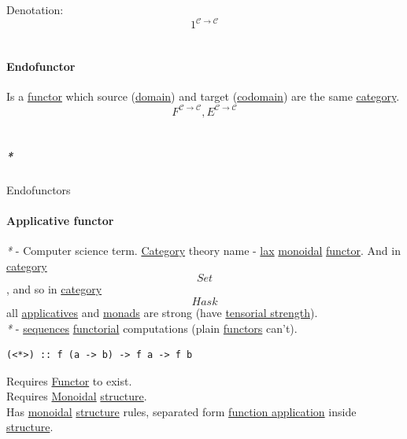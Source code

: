 \documentclass[11pt]{article}
\begin{document}
Denotation:\\
$$ 1^{\mathcal{C \to C}} $$\\

\paragraph{\label{org4dce7a1}Endofunctor}
\label{sec:orgb286a70}
Is a \hyperref[org6073683]{functor} which source (\hyperref[orgf784585]{domain}) and target (\hyperref[orgee70232]{codomain}) are the same \hyperref[org3e3a79b]{category}.\\

$$ F^{\mathcal{C \to C}}, E^{\mathcal{C \to C}} $$\\

\subparagraph{\emph{*}}
\label{sec:org5d44dab}

\label{org1a8cedf}Endofunctors\\

\paragraph{\label{org277f18d}Applicative functor}
\label{sec:org35bfc04}
\emph{*} - Computer science term. \hyperref[org3e3a79b]{Category} theory name - \hyperref[org678d1cb]{lax} \hyperref[org71af906]{monoidal} \hyperref[org6073683]{functor}. And in \hyperref[org3e3a79b]{category} $$ Set $$, and so in \hyperref[org3e3a79b]{category} $$ Hask $$ all \hyperref[org49971fd]{applicatives} and \hyperref[org3ecde32]{monads} are strong (have \hyperref[orgd826451]{tensorial strength}).\\

\emph{*} - \hyperref[orgf15dce2]{sequences} \hyperref[org8ac5764]{functorial} computations (plain \hyperref[org6c3c2a6]{functors} can't).\\

\begin{verbatim}
(<*>) :: f (a -> b) -> f a -> f b
\end{verbatim}

Requires \hyperref[org6073683]{Functor} to exist.\\
Requires \hyperref[org71af906]{Monoidal} \hyperref[org93ee82c]{structure}.\\

Has \hyperref[org71af906]{monoidal} \hyperref[org93ee82c]{structure} rules, separated form \hyperref[org6ff03b0]{function application} inside \hyperref[org93ee82c]{structure}.\\
\end{document}
